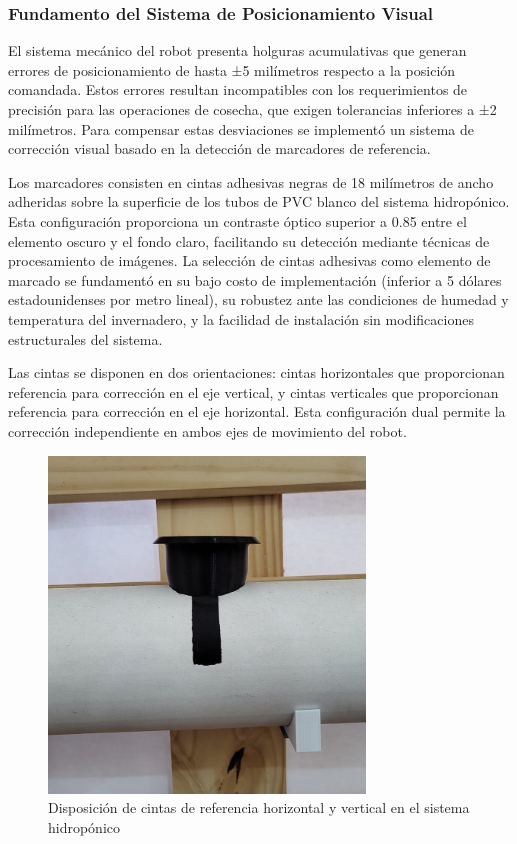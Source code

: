 \subsubsection{Fundamento del Sistema de Posicionamiento Visual}

El sistema mecánico del robot presenta holguras acumulativas que generan errores de posicionamiento de hasta ±5 milímetros respecto a la posición comandada. Estos errores resultan incompatibles con los requerimientos de precisión para las operaciones de cosecha, que exigen tolerancias inferiores a ±2 milímetros. Para compensar estas desviaciones se implementó un sistema de corrección visual basado en la detección de marcadores de referencia.

Los marcadores consisten en cintas adhesivas negras de 18 milímetros de ancho adheridas sobre la superficie de los tubos de PVC blanco del sistema hidropónico. Esta configuración proporciona un contraste óptico superior a 0.85 entre el elemento oscuro y el fondo claro, facilitando su detección mediante técnicas de procesamiento de imágenes. La selección de cintas adhesivas como elemento de marcado se fundamentó en su bajo costo de implementación (inferior a 5 dólares estadounidenses por metro lineal), su robustez ante las condiciones de humedad y temperatura del invernadero, y la facilidad de instalación sin modificaciones estructurales del sistema.

Las cintas se disponen en dos orientaciones: cintas horizontales que proporcionan referencia para corrección en el eje vertical, y cintas verticales que proporcionan referencia para corrección en el eje horizontal. Esta configuración dual permite la corrección independiente en ambos ejes de movimiento del robot.

\begin{figure}[h]
\centering
\includegraphics[width=0.75\textwidth]{imagenes/configuracion_cintas_referencia.jpg}
\caption{Disposición de cintas de referencia horizontal y vertical en el sistema hidropónico}
\label{fig:configuracion_cintas}
\end{figure}

